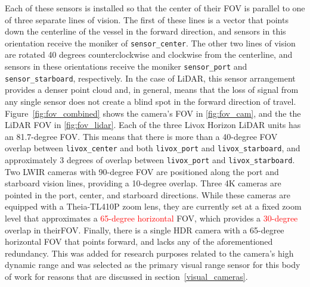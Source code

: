 \documentclass{erauthesis}
\begin{document}
Each of these sensors is installed so that the center of their \ac{FOV} is parallel to one of three separate lines of vision.
The first of these lines is a vector that points down the centerline of the vessel in the forward direction, and sensors in this orientation receive the moniker of \texttt{sensor\_center}.
The other two lines of vision are rotated 40 degrees counterclockwise and clockwise from the centerline, and sensors in these orientations receive the moniker \texttt{sensor\_port} and \texttt{sensor\_starboard}, respectively.
In the case of LiDAR, this sensor arrangement provides a denser point cloud and, in general, means that the loss of signal from any single sensor does not create a blind spot in the forward direction of travel.
Figure~\ref{fig:fov_combined} shows the camera's \ac{FOV} in \ref{fig:fov_cam}, and the the LiDAR \ac{FOV} in \ref{fig:fov_lidar}.
Each of the three Livox Horizon LiDAR units has an 81.7-degree \ac{FOV}. This means that there is more than a 40-degree \ac{FOV} overlap between \texttt{livox\_center} and both \texttt{livox\_port} and \texttt{livox\_starboard}, and approximately 3 degrees of overlap between \texttt{livox\_port} and \texttt{livox\_starboard}.
Two \ac{LWIR} cameras with 90-degree \acs{FOV} are positioned along the port and starboard vision lines, providing a 10-degree overlap.
Three 4K cameras are pointed in the port, center, and starboard directions. While these cameras are equipped with a Theia-TL410P zoom lens, they are currently set at a fixed zoom level that approximates a \textcolor{red}{65-degree horizontal} \ac{FOV}, which provides a \textcolor{red}{30-degree} overlap in their\ac{FOV}.
Finally, there is a single HDR camera with a 65-degree horizontal \ac{FOV} that points forward, and lacks any of the aforementioned redundancy. This was added for research purposes related to the camera's high dynamic range and was selected as the primary visual range sensor for this body of work for reasons that are discussed in section~\ref{visual_cameras}.
\end{document}
